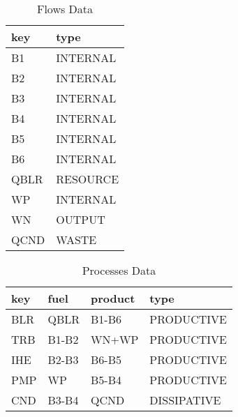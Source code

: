 \begin{table}[H]
\caption{Flows Data}
\label{tab:Flows}
	\begin{tabular}{ll}
		\toprule
		key    & type      \\
		\midrule
		B1     & INTERNAL  \\
		B2     & INTERNAL  \\
		B3     & INTERNAL  \\
		B4     & INTERNAL  \\
		B5     & INTERNAL  \\
		B6     & INTERNAL  \\
		QBLR   & RESOURCE  \\
		WP     & INTERNAL  \\
		WN     & OUTPUT    \\
		QCND   & WASTE     \\
		\bottomrule
	\end{tabular}
\end{table}

\begin{table}[H]
\caption{Processes Data}
\label{tab:Processes}
	\begin{tabular}{llll}
		\toprule
		key   & fuel    & product   & type         \\
		\midrule
		BLR   & QBLR    & B1-B6     & PRODUCTIVE   \\
		TRB   & B1-B2   & WN+WP     & PRODUCTIVE   \\
		IHE   & B2-B3   & B6-B5     & PRODUCTIVE   \\
		PMP   & WP      & B5-B4     & PRODUCTIVE   \\
		CND   & B3-B4   & QCND      & DISSIPATIVE  \\
		\bottomrule
	\end{tabular}
\end{table}

